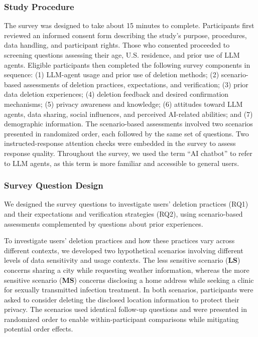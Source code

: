 \subsubsection{Study Procedure}
%
The survey was designed to take about 15 minutes to complete. 
%
Participants first reviewed an informed consent form describing the study's purpose, procedures, data handling, and participant rights. 
%
Those who consented proceeded to screening questions assessing their age, U.S. residence, and prior use of LLM agents.
%
Eligible participants then completed the following survey components in sequence: (1) LLM-agent usage and prior use of deletion methods; (2) scenario-based assessments of deletion practices, expectations, and verification; (3) prior data deletion experiences; (4) deletion feedback and desired confirmation mechanisms; (5) privacy awareness and knowledge; (6) attitudes toward LLM agents, data sharing, social influences, and perceived AI-related abilities; and (7) demographic information.
%
The scenario-based assessments involved two scenarios presented in randomized order, each followed by the same set of questions. 
%
Two instructed-response attention checks were embedded in the survey to assess response quality. Throughout the survey, we used the term ``AI chatbot'' to refer to LLM agents, as this term is more familiar and accessible to general users.

\subsubsection{Survey Question Design}
%
\label{subsubsec:questions}
%
We designed the survey questions to investigate users' deletion practices (RQ1) and their expectations and verification strategies (RQ2), using scenario-based assessments complemented by questions about prior experiences.

%
To investigate users' deletion practices and how these practices vary across different contexts, we developed two hypothetical scenarios involving different levels of data sensitivity and usage contexts.
%
The less sensitive scenario (\textbf{LS}) concerns sharing a city while requesting weather information, whereas the more sensitive scenario (\textbf{MS}) concerns disclosing a home address while seeking a clinic for sexually transmitted infection treatment.
%
In both scenarios, participants were asked to consider deleting the disclosed location information to protect their privacy. 
%
The scenarios used identical follow-up questions and were presented in randomized order to enable within-participant comparisons while mitigating potential order effects.

